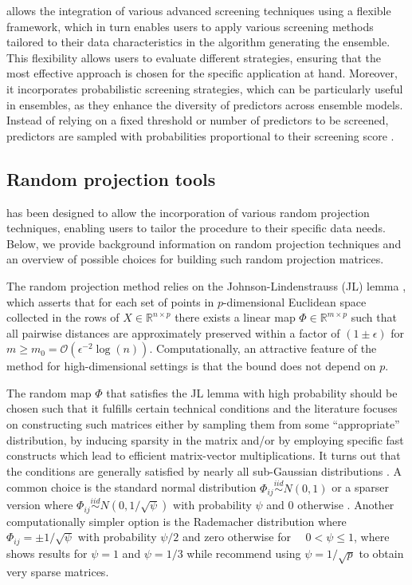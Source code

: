 \documentclass[
  article]{jss}
\begin{document}
 allows the integration of various advanced screening
techniques using a flexible framework, which in turn enables users to
apply various screening methods tailored to their data characteristics
in the algorithm generating the ensemble. This flexibility allows users
to evaluate different strategies, ensuring that the most effective
approach is chosen for the specific application at hand. Moreover, it
incorporates probabilistic screening strategies, which can be
particularly useful in ensembles, as they enhance the diversity of
predictors across ensemble models. Instead of relying on a fixed
threshold or number of predictors to be screened, predictors are sampled
with probabilities proportional to their screening score
\citep[see][]{Dunson2020TargRandProj, parzer2024glms}.

\subsection{Random projection tools}\label{sec-rps}

 has been designed to allow the incorporation of various
random projection techniques, enabling users to tailor the procedure to
their specific data needs. Below, we provide background information on
random projection techniques and an overview of possible choices for
building such random projection matrices.

The random projection method relies on the Johnson-Lindenstrauss (JL)
lemma \citep{JohnsonLindenstrauss1984}, which asserts that for each set
of points in \(p\)-dimensional Euclidean space collected in the rows of
\(X\in \mathbb{R}^{n\times p}\) there exists a linear map
\(\Phi\in \mathbb{R}^{m \times p}\) such that all pairwise distances are
approximately preserved within a factor of \((1\pm\epsilon)\) for
\(m\geq m_0=\mathcal O(\epsilon^{-2}\log(n))\). Computationally, an
attractive feature of the method for high-dimensional settings is that
the bound does not depend on \(p\).

The random map \(\Phi\) that satisfies the JL lemma with high
probability should be chosen such that it fulfills certain technical
conditions and the literature focuses on constructing such matrices
either by sampling them from some ``appropriate'' distribution, by
inducing sparsity in the matrix and/or by employing specific fast
constructs which lead to efficient matrix-vector multiplications. It
turns out that the conditions are generally satisfied by nearly all
sub-Gaussian distributions \citep{matouvsek2008variants}. A common
choice is the standard normal distribution
\(\Phi_{ij} \overset{iid}{\sim} N(0,1)\) \citep{FRANKL1988JLSphere} or a
sparser version where
\(\Phi_{ij}\overset{iid}{\sim} N(0,1/\sqrt{\psi})\) with probability
\(\psi\) and \(0\) otherwise \citep{matouvsek2008variants}. Another
computationally simpler option is the Rademacher distribution where
\(\Phi_{ij} =  \pm 1/\sqrt{\psi}\) with probability \(\psi/2\) and zero
otherwise for \(\quad 0<\psi\leq 1\), where \citet{ACHLIOPTAS2003JL}
shows results for \(\psi=1\) and \(\psi=1/3\) while
\citet{LiHastie2006VerySparseRP} recommend using \(\psi=1/\sqrt{p}\) to
obtain very sparse matrices.
\end{document}
